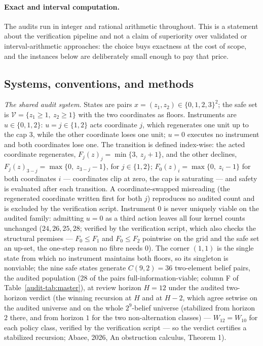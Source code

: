 \documentclass[10pt,twocolumn]{article}
\theoremstyle{plain}
\theoremstyle{definition}
\theoremstyle{remark}
\begin{document}
\paragraph{Exact and interval computation.} The audits run in integer and rational arithmetic
throughout. This is a statement about the verification pipeline and not a claim of superiority
over validated or interval-arithmetic approaches: the choice buys exactness at the cost of
scope, and the instances below are deliberately small enough to pay that price.

\subsection{Systems, conventions, and methods}\label{audit-frame}

\emph{The shared audit system.} States are pairs
\(x = (z_1, z_2) \in \{0,1,2,3\}^{2}\); the safe set is
\(\mathcal{V} = \{z_1 \ge 1,\ z_2 \ge 1\}\) with the two coordinates as
floors. Instruments are \(u \in \{0, 1, 2\}\): \(u = j \in \{1,2\}\)
acts coordinate \(j\), which regenerates one unit up to the cap \(3\),
while the other coordinate loses one unit; \(u = 0\) executes no
instrument and both coordinates lose one. The transition is defined index-wise: the acted coordinate regenerates, \(F_j(z)_j = \min\{3,\ z_j + 1\}\), and the other declines, \(F_j(z)_{3-j} = \max\{0,\ z_{3-j} - 1\}\), for \(j \in \{1,2\}\); \(F_0(z)_i = \max\{0,\ z_i - 1\}\) for both coordinates \(i\) --- coordinates clip at zero, the cap is saturating --- and safety is evaluated after each transition. A coordinate-swapped misreading (the regenerated coordinate written first for both \(j\)) reproduces no audited count and is excluded by the verification script. Instrument \(0\) is never uniquely viable on the audited family: admitting \(u = 0\) as a third action leaves all four kernel counts unchanged (\(24, 26, 25, 28\); verified by the verification script, which also checks the structural premises --- \(F_0 \le F_1\) and \(F_0 \le F_2\) pointwise on the grid and the safe set an up-set, the one-step reason no fibre needs \(0\)). The corner \((1,1)\) is the
single state from which no instrument maintains both floors, so its
singleton is nonviable; the nine safe states generate
\(C(9,2) = 36\) two-element belief pairs, the audited population (28 of the pairs full-information-viable; column F of Table~\ref{audit-tab:master}), at review horizon \(H = 12\) under the audited two-horizon verdict (the winning recursion at \(H\) and at \(H - 2\), which agree setwise on the audited universe and on the whole \(2^9\)-belief universe (stabilized from horizon \(2\) there, and from horizon \(1\) for the two non-alternation classes) --- \(W_{12} = W_{10}\) for each policy class, verified by the verification script --- so the verdict certifies a stabilized recursion; Abaee, 2026, An obstruction calculus, Theorem 1).
\end{document}
